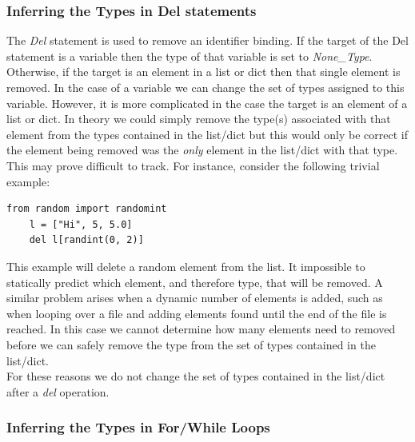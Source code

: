 \documentclass[12pt, titlepage]{article}
\begin{document}
\subsubsection{Inferring the Types in Del statements}
The \textit{Del} statement is used to remove an identifier binding. If the target of the Del statement is a variable then the type of that variable is set to \textit{None\_Type}. Otherwise, if the target is an element in a list or dict then that single element is removed. In the case of a variable we can change the set of types assigned to this variable. However, it is more complicated in the case the target is an element of a list or dict. In theory we could simply remove the type(s) associated with that element from the types contained in the list/dict but this would only be correct if the element being removed was the \textit{only} element in the list/dict with that type. This may prove difficult to track. For instance, consider the following trivial example:
\begin{lstlisting}[mathescape]
    from random import randomint
    l = ["Hi", 5, 5.0]
    del l[randint(0, 2)]
\end{lstlisting}
This example will delete a random element from the list. It impossible to statically predict which element, and therefore type, that will be removed. A similar problem arises when a dynamic number of elements is added, such as when looping over a file and adding elements found until the end of the file is reached. In this case we cannot determine how many elements need to removed before we can safely remove the type from the set of types contained in the list/dict. \\
For these reasons we do not change the set of types contained in the list/dict after a \textit{del} operation.

\subsubsection{Inferring the Types in For/While Loops}
\end{document}
